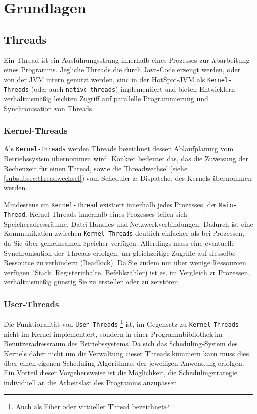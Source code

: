 \section{Grundlagen}
\label{sec:grundlagen}

\subsection{Threads}
\label{subsec:threads}
Ein Thread ist ein Ausführungsstrang innerhalb eines Prozesses zur Abarbeitung eines Programms.
Jegliche Threads die durch Java-Code erzeugt werden, oder von der JVM intern genutzt werden,
sind in der HotSpot-JVM als \verb|Kernel-Threads| (oder auch \verb|native threads|) implementiert
und bieten Entwicklern verhältnismäßig leichten Zugriff auf parallelle Programmierung und Synchronisation von Threads.
\parencite[Absatz Thread Management]{OpenJDKHotspotOverview}

\subsubsection{Kernel-Threads}
\label{subsubsec:kernel-threads}
Als \verb|Kernel-Threads| werden Threads bezeichnet dessen Ablaufplanung vom Betriebssystem übernommen wird.
Konkret bedeutet das, das die Zuweisung der Rechenzeit für einen Thread, sowie die Threadwechsel (siehe \ref{subsubsec:threadwechsel})
vom Scheduler \& Dispatcher des Kernels übernommen werden.

Mindestens ein \verb|Kernel-Thread| existiert innerhalb jedes Prozesses, der \verb|Main-Thread|. Kernel-Threads innerhalb eines Prozesses
teilen sich Speicheradressräume, Datei-Handles und Netzwerkverbindungen. Dadurch ist eine Kommunikation zwischen \verb|Kernel-Threads| deutlich
einfacher als bei Prozessen, da Sie über gemeinsamen Speicher verfügen. Allerdings muss eine eventuelle Synchronisation der Threads erfolgen, um
gleichzeitige Zugriffe auf diesselbe Ressource zu verhindern (Deadlock).
Da Sie zudem nur über wenige Ressourcen verfügen (Stack, Registerinhalte, Befehlszähler) ist es, im Vergleich zu Prozessen,
verhältnismäßig günstig Sie zu erstellen oder zu zerstören. \parencite[Kapitel 2.2.5 - Implementing Threads in the Kernel]{Tanenbaum2016}\parencite{Brosenne2021}

\subsubsection{User-Threads}
\label{subsubsec:user-threads}
Die Funktionalität von \verb|User-Threads| \footnote{Auch als Fiber oder virtueller Thread bezeichnet} ist, im Gegensatz zu \verb|Kernel-Threads|
nicht im Kernel implementiert, sondern in einer Programmbibliothek im Benutzeradressraum des Betriebssystems.
Da sich das Scheduling-System des Kernels daher nicht um die Verwaltung dieser Threads kümmern kann muss dies über einen eigenen Scheduling-Algorithmus
der jeweiligen Anwendung erfolgen.
Ein Vorteil dieser Vorgehensweise ist die Möglichkeit, die Schedulingstrategie individuell an die Arbeitslast des Programms anzupassen.

